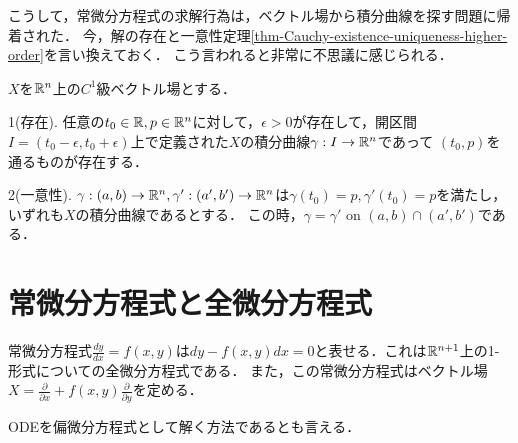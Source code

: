 \documentclass[uplatex,dvipdfmx]{jsreport}
\begin{document}
こうして，常微分方程式の求解行為は，ベクトル場から積分曲線を探す問題に帰着された．
今，解の存在と一意性定理\ref{thm-Cauchy-existence-uniqueness-higher-order}を言い換えておく．
こう言われると非常に不思議に感じられる．
\begin{theorem}[解の存在と一意性定理のベクトル場への翻訳]
    $X$を$\mathbb{R}^n$上の$C^1$級ベクトル場とする．

    1(存在). 任意の$t_0\in\mathbb{R},p\in\mathbb{R}^n$に対して，$\epsilon>0$が存在して，開区間$I=(t_0-\epsilon,t_0+\epsilon)$上で定義された$X$の積分曲線$\gamma:I\to\mathbb{R}^n$であって
    $(t_0,p)$を通るものが存在する．

    2(一意性). $\gamma:(a,b)\to\mathbb{R}^n,\gamma':(a',b')\to\mathbb{R}^n$は$\gamma(t_0)=p,\gamma'(t_0)=p$を満たし，いずれも$X$の積分曲線であるとする．
    この時，$\gamma=\gamma'$ on $(a,b)\cap(a',b')$である．
\end{theorem}

\section{常微分方程式と全微分方程式}
常微分方程式$\frac{dy}{dx}=f(x,y)$は$dy-f(x,y)dx=0$と表せる．これは$\mathbb{R}^{n+1}$上の1-形式についての全微分方程式である．
また，この常微分方程式はベクトル場$X=\frac{\partial}{\partial x}+f(x,y)\frac{\partial}{\partial y}$を定める．

ODEを偏微分方程式として解く方法であるとも言える．
\end{document}
